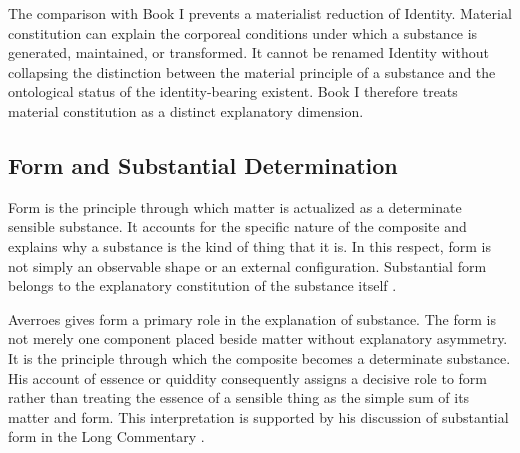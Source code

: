 \label{para:VS.B01.P01.C08.S15.SS05.P004}

The comparison with Book I prevents a materialist reduction
of Identity. Material constitution can explain the
corporeal conditions under which a substance is generated,
maintained, or transformed. It cannot be renamed Identity
without collapsing the distinction between the material
principle of a substance and the ontological status of
the identity-bearing existent. Book I therefore treats
material constitution as a distinct explanatory dimension.



\subsection{Form and Substantial Determination}
\label{subsec:ch08_s15_ss06}

\label{para:VS.B01.P01.C08.S15.SS06.P001}

Form is the principle through which matter is actualized
as a determinate sensible substance. It accounts for the
specific nature of the composite and explains why a
substance is the kind of thing that it is. In this respect,
form is not simply an observable shape or an external
configuration. Substantial form belongs to the explanatory
constitution of the substance itself
\citep{AristotleMetaphysics,
AverroesLongCommentaryMetaphysicsBouyges1990,
DiGiovanniSubstantialFormAverroes2011}.

\label{para:VS.B01.P01.C08.S15.SS06.P002}

Averroes gives form a primary role in the explanation of
substance. The form is not merely one component placed
beside matter without explanatory asymmetry. It is the
principle through which the composite becomes a determinate
substance. His account of essence or quiddity consequently
assigns a decisive role to form rather than treating the
essence of a sensible thing as the simple sum of its matter
and form. This interpretation is supported by his discussion
of substantial form in the Long Commentary
\citep{AverroesLongCommentaryMetaphysicsBouyges1990,
DiGiovanniSubstantialFormAverroes2011}.

